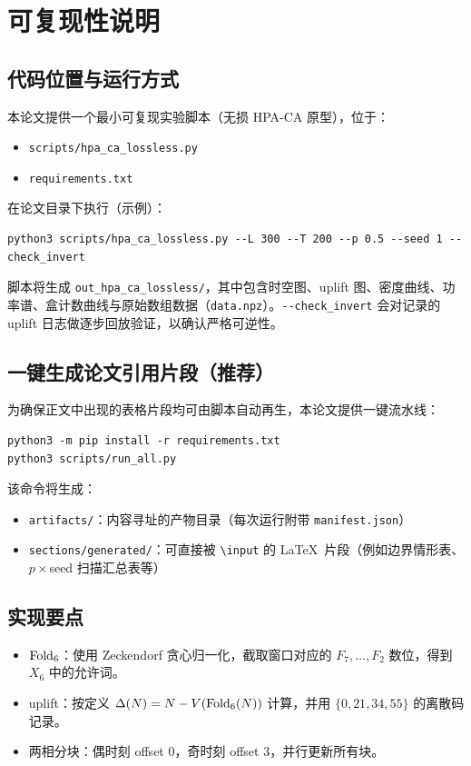 
\section{可复现性说明}\label{app:reproducibility}

\subsection{代码位置与运行方式}

本论文提供一个最小可复现实验脚本（无损 HPA-CA 原型），位于：

\begin{itemize}
  \item \texttt{scripts/hpa\_ca\_lossless.py}
  \item \texttt{requirements.txt}
\end{itemize}

在论文目录下执行（示例）：
\begin{verbatim}
python3 scripts/hpa_ca_lossless.py --L 300 --T 200 --p 0.5 --seed 1 --check_invert
\end{verbatim}

脚本将生成 \texttt{out\_hpa\_ca\_lossless/}，其中包含时空图、uplift 图、密度曲线、功率谱、盒计数曲线与原始数组数据（\texttt{data.npz}）。\texttt{-{}-check\_invert} 会对记录的 uplift 日志做逐步回放验证，以确认严格可逆性。

\subsection{一键生成论文引用片段（推荐）}

为确保正文中出现的表格片段均可由脚本自动再生，本论文提供一键流水线：
\begin{verbatim}
python3 -m pip install -r requirements.txt
python3 scripts/run_all.py
\end{verbatim}
该命令将生成：
\begin{itemize}
  \item \texttt{artifacts/}：内容寻址的产物目录（每次运行附带 \texttt{manifest.json}）
  \item \texttt{sections/generated/}：可直接被 \texttt{\textbackslash input} 的 \LaTeX\ 片段（例如边界情形表、$p\times$seed 扫描汇总表等）
\end{itemize}

\subsection{实现要点}

\begin{itemize}
  \item $\mathrm{Fold}_6$：使用 Zeckendorf 贪心归一化，截取窗口对应的 $F_7,\dots,F_2$ 数位，得到 $X_6$ 中的允许词。
  \item uplift：按定义 $\Delta(N)=N-V(\mathrm{Fold}_6(N))$ 计算，并用 $\{0,21,34,55\}$ 的离散码记录。
  \item 两相分块：偶时刻 offset $0$，奇时刻 offset $3$，并行更新所有块。
\end{itemize}

